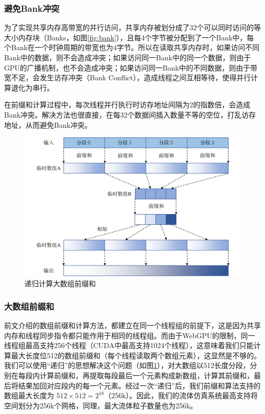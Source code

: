 \subsubsection{避免Bank冲突}
    为了实现共享内存高带宽的并行访问，共享内存被划分成了32个可以同时访问的等大小内存块（Banks，如图\ref{fig:bank}），且每4个字节被分配到了一个Bank中，每个Bank在一个时钟周期的带宽也为4字节。所以在读取共享内存时，如果访问不同Bank中的数据，则不会造成冲突；如果访问同一Bank中的同一个数据，则由于GPU的广播机制，也不会造成冲突；如果访问同一Bank中的不同数据，则由于带宽不足，会发生访存冲突（Bank Conflict），造成线程之间互相等待，使得并行计算退化为串行。
    
    在前缀和计算过程中，每次线程并行执行时访存地址间隔为2的指数倍，会造成Bank冲突。解决方法也很直接，在每32个数据间插入数量不等的空位，打乱访存地址，从而避免Bank冲突。
    
    \begin{figure}
    	\centering
    	\includegraphics[width=.7\textwidth]{figures/neighbor/big_size_scan.pdf}
    	\caption{递归计算大数组前缀和}
    	\label{fig:bigarryscan}
    \end{figure}

\subsubsection{大数组前缀和}
    前文介绍的数组前缀和计算方法，都建立在同一个线程组的前提下，这是因为共享内存和线程同步指令都只能作用于相同的线程组。而由于WebGPU的限制，同一线程组最高支持256个线程（CUDA中最高支持1024个线程），这意味着我们只能计算最大长度位512的数组前缀和（每个线程读取两个数组元素），这显然是不够的。我们可以使用“递归”的思想解决这个问题（如图\ref{fig:bigarryscan}），对大数组以512长度分段，分别在每段内计算前缀和，再提取每段最后一个元素构成新数组，计算其前缀和，最后将结果加回对应段内的每一个元素。经过一次“递归”后，我们前缀和算法支持的数组最大长度为 $512\times512=2^{18}$（256k）。因此，我们的流体仿真系统最高支持将空间划分为256k个网格，同理，最大流体粒子数量也为256k。


